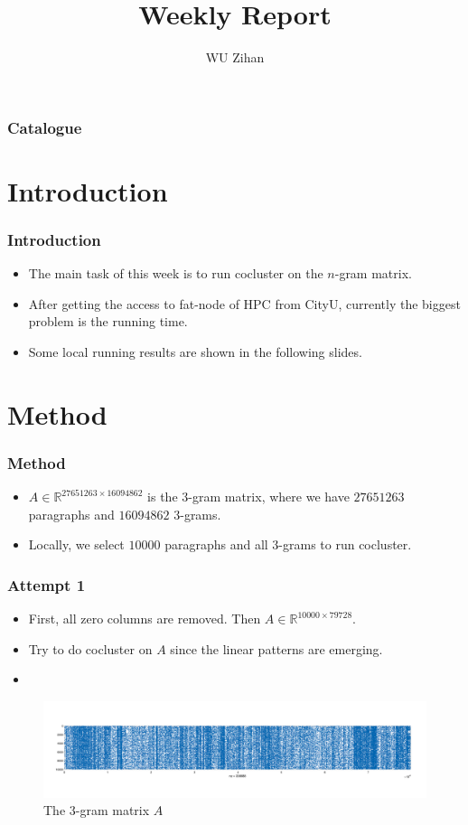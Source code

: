 \documentclass{beamer}
\title{Weekly Report}
\author{WU Zihan}
\begin{document}
\maketitle
\begin{frame}
    \frametitle{Catalogue}
    \tableofcontents
\end{frame}

\section{Introduction}
\begin{frame}
    \frametitle{Introduction}
    \begin{itemize}
        \item The main task of this week is to run cocluster on the $n$-gram matrix.
        \item After getting the access to fat-node of HPC from CityU, currently the biggest problem is the running time.
        \item Some local running results are shown in the following slides.
    \end{itemize}
\end{frame}

\section{Method}
\begin{frame}
    \frametitle{Method}
    \begin{itemize}
        \item $A\in \mathbb{R}^{27651263\times16094862}$ is the $3$-gram matrix, where we have $27651263$ paragraphs and $16094862$ $3$-grams.
        \item Locally, we select $10000$ paragraphs and all $3$-grams to run cocluster.
        
    \end{itemize}
\end{frame}
\begin{frame}
    \frametitle{Attempt 1}
    \begin{itemize}
        \item First, all zero columns are removed. Then $A \in \mathbb{R}^{10000\times 79728}$.
        \item Try to do cocluster on $A$ since the linear patterns are emerging.
        \item 
    \end{itemize}
    \begin{figure}[htbp]
        \centering
        \includegraphics[width=\textwidth]{pic/A.png}
        \caption{The $3$-gram matrix $A$}
    \end{figure}


\end{frame}
\end{document}
